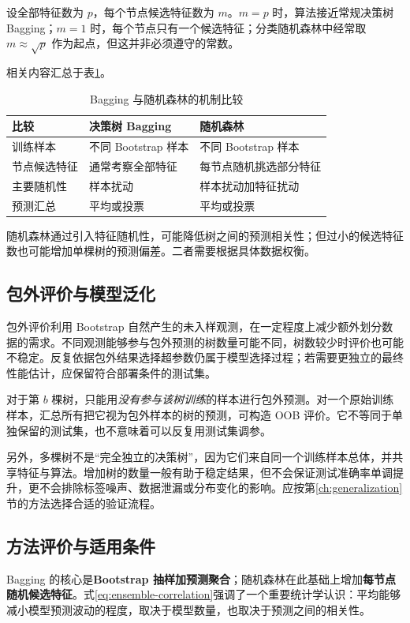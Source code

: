 设全部特征数为 $p$，每个节点候选特征数为 $m$。$m=p$ 时，算法接近常规决策树 Bagging；$m=1$ 时，每个节点只有一个候选特征；分类随机森林中经常取 $m\approx\sqrt p$ 作为起点，但这并非必须遵守的常数。

相关内容汇总于表\ref{tab:bagging-forest}。
\begin{table}[htbp]\centering
\caption{Bagging 与随机森林的机制比较}\label{tab:bagging-forest}
\begin{tabularx}{\textwidth}{p{31mm}XX}\toprule
比较&决策树 Bagging&随机森林\\\midrule
训练样本&不同 Bootstrap 样本&不同 Bootstrap 样本\\
节点候选特征&通常考察全部特征&每节点随机挑选部分特征\\
主要随机性&样本扰动&样本扰动加特征扰动\\
预测汇总&平均或投票&平均或投票\\\bottomrule
\end{tabularx}
\end{table}
随机森林通过引入特征随机性，可能降低树之间的预测相关性；但过小的候选特征数也可能增加单棵树的预测偏差。二者需要根据具体数据权衡。

\subsection{包外评价与模型泛化}

包外评价利用 Bootstrap 自然产生的未入样观测，在一定程度上减少额外划分数据的需求。不同观测能够参与包外预测的树数量可能不同，树数较少时评价也可能不稳定。反复依据包外结果选择超参数仍属于模型选择过程；若需要更独立的最终性能估计，应保留符合部署条件的测试集。

对于第 $b$ 棵树，只能用\emph{没有参与该树训练}的样本进行包外预测。对一个原始训练样本，汇总所有把它视为包外样本的树的预测，可构造 OOB 评价。它不等同于单独保留的测试集，也不意味着可以反复用测试集调参。

另外，多棵树不是“完全独立的决策树”，因为它们来自同一个训练样本总体，并共享特征与算法。增加树的数量一般有助于稳定结果，但不会保证测试准确率单调提升，更不会排除标签噪声、数据泄漏或分布变化的影响。应按第\ref{ch:generalization}节的方法选择合适的验证流程。

\subsection{方法评价与适用条件}

Bagging 的核心是\textbf{Bootstrap 抽样加预测聚合}；随机森林在此基础上增加\textbf{每节点随机候选特征}。式\eqref{eq:ensemble-correlation}强调了一个重要统计学认识：平均能够减小模型预测波动的程度，取决于模型数量，也取决于预测之间的相关性。
